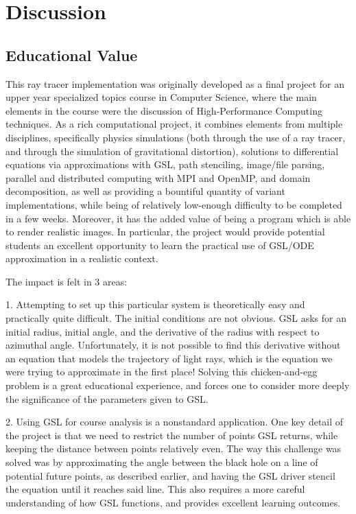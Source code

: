 

\section{Discussion}
\label{sec:disc}

\subsection{Educational Value}

This ray tracer implementation was originally developed as a final project for
an upper year specialized topics course in Computer Science, where the main
elements in the course were the discussion of High-Performance Computing
techniques.
As a rich computational project, it combines elements from multiple disciplines, specifically
physics simulations (both through the use of a ray tracer, and through the simulation of gravitational distortion),
solutions to differential equations via approximations with GSL,
path stenciling, image/file parsing,
parallel and distributed computing with MPI and OpenMP, and domain decomposition,
as well as providing a bountiful quantity of variant implementations,
while being of relatively low-enough difficulty to be completed in a few weeks.
Moreover, it has the added value of being a 
program which is able to render realistic images.
In particular, the project would provide potential students an excellent opportunity to learn the practical use of GSL/ODE approximation in a realistic context.

The impact is felt in 3 areas:

1. Attempting to set up this particular system is theoretically easy and practically quite difficult. The initial conditions are not obvious. GSL asks for an initial radius, initial angle, and the derivative of the radius with respect to azimuthal angle. Unfortunately, it is not possible to find this derivative without an equation that models the trajectory of light rays, which is the equation we were trying to approximate in the first place! Solving this chicken-and-egg problem is a great educational experience, and forces one to consider more deeply the significance of the parameters given to GSL. 

2. Using GSL for course analysis is a nonstandard application. One key detail of the project is that we need to restrict the number of points GSL returns, while keeping the distance between points relatively even. The way this challenge was solved was by approximating the angle between the black hole on a line of potential future points, as described earlier, and having the GSL driver stencil the equation until it reaches said line. This also requires a more careful understanding of how GSL functions, and provides excellent learning outcomes.

